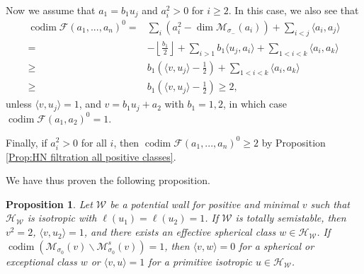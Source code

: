 \documentclass[leqno,11pt]{amsart}
\def\codim{\mathop{\mathrm{codim}}\nolimits}
\def\dim{\mathop{\mathrm{dim}}\nolimits}
\newtheorem{Prop}[Thm]{Proposition}
\theoremstyle{definition}
\def\FF{\ensuremath{\mathcal F}}
\def\HH{\ensuremath{\mathcal H}}
\def\MM{\ensuremath{\mathcal M}}
\def\WW{\ensuremath{\mathcal W}}
\begin{document}
Now we assume that $a_1=b_1 u_j$ and $a_i^2>0$ for $i \geq 2$.
In this case, we also see that
\begin{equation}
\begin{split}
\codim\FF(a_1,...,a_n)^0=&\sum_i (a_i^2-\dim \MM_{\sigma_-}(a_i))+\sum_{i<j}\langle a_i,a_j \rangle\\
=&-\left\lfloor\frac{b_1}{2}\right\rfloor+\sum_{i>1}b_1\langle u_j,a_i\rangle+\sum_{1<i<k}\langle a_i,a_k\rangle\\
\geq&b_1(\langle v,u_j\rangle-\frac{1}{2})+\sum_{1<i<k}\langle a_i,a_k\rangle\\
\geq&b_1(\langle v,u_j\rangle-\frac{1}{2})\geq 2,
\end{split}
\end{equation}
unless $\langle v,u_j\rangle=1$, and $v=b_1u_j+a_2$ with $b_1=1,2$, in which case $\codim\FF(a_1,a_2)^0=1$.  

Finally, if $a_i^2>0$ for all $i$, then $\codim\FF(a_1,...,a_n)^0\geq 2$ by Proposition \ref{Prop:HN filtration all positive classes}.

We have thus proven the following proposition.

\begin{Prop}\label{Prop: 1-1 case totally semistable and codim 1}
Let $\WW$ be a potential wall for positive and minimal $v$ such that $\HH_{\WW}$ is isotropic with $\ell(u_1)=\ell(u_2)=1$.  If $\WW$ is totally semistable, then $v^2=2$, $\langle v,u_2\rangle=1$, and there exists an effective spherical class $w\in\HH_{\WW}$.  If $\codim(\MM_{\sigma_0}(v)\backslash\MM^s_{\sigma_0}(v))=1$, then $\langle v,w\rangle=0$ for a spherical or exceptional class $w$ or $\langle v,u\rangle=1$ for a primitive isotropic $u\in\HH_{\WW}$.
\end{Prop}
\end{document}
